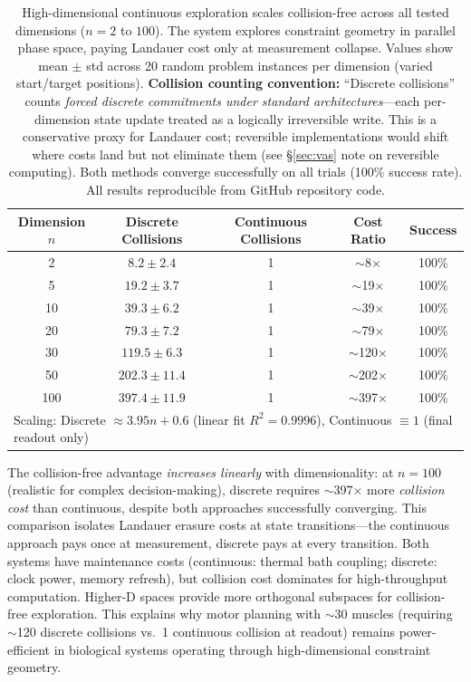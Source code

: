\documentclass[12pt]{article}
\begin{document}
\begin{table}[h]
\centering
\caption{High-dimensional continuous exploration scales collision-free across all tested dimensions ($n=2$ to $100$). The system explores constraint geometry in parallel phase space, paying Landauer cost only at measurement collapse. Values show mean $\pm$ std across 20 random problem instances per dimension (varied start/target positions). \textbf{Collision counting convention:} ``Discrete collisions'' counts \textit{forced discrete commitments under standard architectures}---each per-dimension state update treated as a logically irreversible write. This is a conservative proxy for Landauer cost; reversible implementations would shift where costs land but not eliminate them (see §\ref{sec:vas} note on reversible computing). Both methods converge successfully on all trials (100\% success rate). All results reproducible from GitHub repository code.}
\label{tab:vas_scaling}
\begin{tabular}{ccccc}
\toprule
Dimension $n$ & Discrete Collisions & Continuous Collisions & Cost Ratio & Success \\
\midrule
2   & $8.2 \pm 2.4$    & 1 & $\sim$8$\times$ & 100\% \\
5   & $19.2 \pm 3.7$   & 1 & $\sim$19$\times$ & 100\% \\
10  & $39.3 \pm 6.2$   & 1 & $\sim$39$\times$ & 100\% \\
20  & $79.3 \pm 7.2$   & 1 & $\sim$79$\times$ & 100\% \\
30  & $119.5 \pm 6.3$  & 1 & $\sim$120$\times$ & 100\% \\
50  & $202.3 \pm 11.4$ & 1 & $\sim$202$\times$ & 100\% \\
100 & $397.4 \pm 11.9$ & 1 & $\sim$397$\times$ & 100\% \\
\bottomrule
\multicolumn{5}{l}{\small Scaling: Discrete $\approx 3.95n + 0.6$ (linear fit $R^2 = 0.9996$), Continuous $\equiv 1$ (final readout only)}
\end{tabular}
\end{table}

The collision-free advantage \textit{increases linearly} with dimensionality: at $n=100$ (realistic for complex decision-making), discrete requires $\sim$397$\times$ more \emph{collision cost} than continuous, despite both approaches successfully converging. This comparison isolates Landauer erasure costs at state transitions—the continuous approach pays once at measurement, discrete pays at every transition. Both systems have maintenance costs (continuous: thermal bath coupling; discrete: clock power, memory refresh), but collision cost dominates for high-throughput computation. Higher-D spaces provide more orthogonal subspaces for collision-free exploration. This explains why motor planning with $\sim$30 muscles (requiring $\sim$120 discrete collisions vs.\ 1 continuous collision at readout) remains power-efficient in biological systems operating through high-dimensional constraint geometry.
\end{document}
